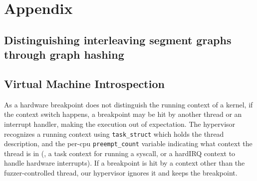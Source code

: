 \section{Appendix}


%




\subsection{Distinguishing interleaving segment graphs through graph
  hashing}
\label{s:appendix:hash}


\subsection{Virtual Machine Introspection}
\label{s:appendix:vmi}


As a hardware breakpoint does not distinguish the running context of a
kernel, if the context switch happens, a breakpoint may be hit by
another thread or an interrupt handler, making the execution out of
expectation.
%
The hypervisor recognizes a running context using \texttt{task_struct}
which holds the thread description, and the per-cpu
\texttt{preempt_count} variable indicating what context the thread is
in (\eg, a task context for running a syscall, or a hardIRQ context to
handle hardware interrupts).
%
If a breakpoint is hit by a context other than the fuzzer-controlled
thread, our hypervisor ignores it and keeps the breakpoint.



